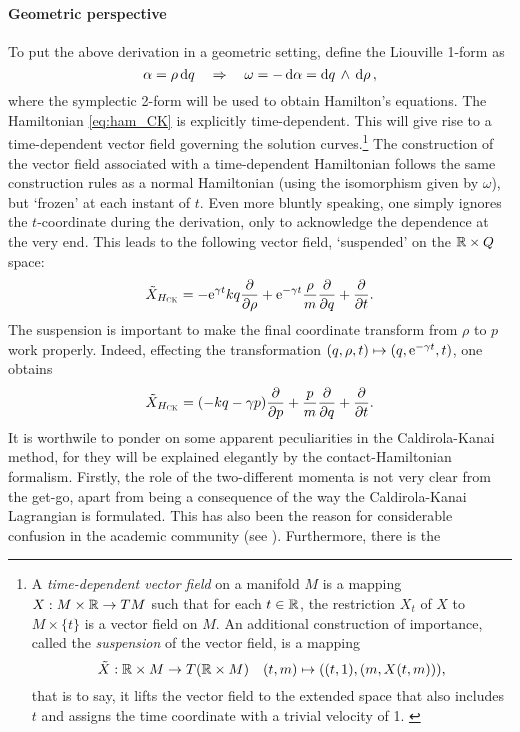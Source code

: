 \paragraph{Geometric perspective}
To put the above derivation in a geometric setting, define the Liouville 1-form as
$$ \alpha = \rho\dd{q} \quad \Rightarrow \quad \omega = -\dd{\alpha} =  \dd{q}\,\wedge\,\dd{\ensuremath{\rho}} ,$$
where the symplectic 2-form will be used to obtain Hamilton's equations. The Hamiltonian \cref{eq:ham_CK} is explicitly time-dependent. This will give rise to a time-dependent vector field governing the solution curves.\footnote
{A \emph{time-dependent vector field} on a manifold $M$ is a mapping $X: M\times\mathbb{R} \to TM$ such that for each $t \in \mathbb{R}$, the restriction $X_t$ of $X$ to $M \times \{t\}$ is a vector field on $M$. \cite{Libermann1987} An additional construction of importance, called the \emph{suspension} of the vector field, is a mapping $$ \tilde{X}: \mathbb{R} \times M \to T(\mathbb{R} \times M) \quad (t, m) \mapsto ((t, 1), (m, X(t, m))),$$ that is to say, it lifts the vector field to the extended space that also includes $t$ and assigns the time coordinate with a trivial velocity of 1. \cite{Abraham1978}}
The construction of the vector field associated with a time-dependent Hamiltonian follows the same construction rules as a normal Hamiltonian (using the isomorphism given by $\omega$), but `frozen' at each instant of $t$. Even more bluntly speaking, one simply ignores the $t$-coordinate during the derivation, only to acknowledge the dependence at the very end. This leads to the following vector field, `suspended' on the $\mathbb{R}\times Q$ space:
$$ \tilde{X}_{H_\text{\tiny{\textsc{CK}}}} = -\mathrm{e}^{\gamma t}kq\pdv{}{\ensuremath{\rho}} + \mathrm{e}^{-\gamma t}\frac{\rho}{m}\pdv{}{q} + \pdv{}{t}.$$
The suspension is important to make the final coordinate transform from $\rho$ to $p$ work properly. Indeed, effecting the transformation $(q, \rho, t) \mapsto (q, \mathrm{e}^{-\gamma t}, t)$, one obtains
$$ \tilde{X}_{H_\text{\tiny{\textsc{CK}}}} = \qty(-kq - \gamma p)\pdv{}{p} + \frac{p}{m}\pdv{}{q} + \pdv{}{t}.$$
It is worthwile to ponder on some apparent peculiarities in the Caldirola-Kanai method, for they will be explained elegantly by the contact-Hamiltonian formalism. Firstly, the role of the two-different momenta is not very clear from the get-go, apart from being a consequence of the way the Caldirola-Kanai Lagrangian is formulated. This has also been the reason for considerable confusion in the academic community (see \citet{Schuch1997}). Furthermore, there is the 

